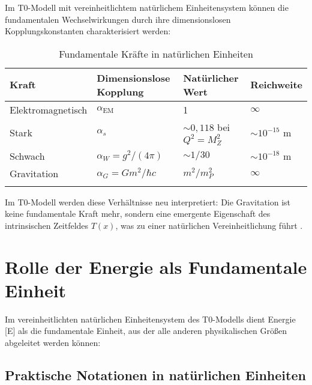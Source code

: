 \documentclass[12pt,a4paper]{article}
\newcommand{\Tfield}{T(x)}
\newcommand{\alphaEM}{\alpha_{\text{EM}}}
\begin{document}
	Im T0-Modell mit vereinheitlichtem natürlichem Einheitensystem können die fundamentalen Wechselwirkungen durch ihre dimensionslosen Kopplungskonstanten charakterisiert werden:
	
	\begin{table}[ht]
		\centering
		\begin{adjustbox}{scale=0.95}
			\begin{tabular}{llll}
				\hline
				\textbf{Kraft} & \textbf{Dimensionslose Kopplung} & \textbf{Natürlicher Wert} & \textbf{Reichweite} \\
				\hline
				Elektromagnetisch & $\alphaEM$ & 1 & $\infty$ \\
				Stark & $\alpha_s$ & $\sim 0,118$ bei $Q^2=M_Z^2$ & $\sim 10^{-15}$ m \\
				Schwach & $\alpha_W = g^2/(4\pi)$ & $\sim 1/30$ & $\sim 10^{-18}$ m \\
				Gravitation & $\alpha_G = Gm^2/\hbar c$ & $m^2/m_P^2$ & $\infty$ \\
				\hline
				\multicolumn{3}{c}{} \\
				\hline
			\end{tabular}
		\end{adjustbox}
		\caption{Fundamentale Kräfte in natürlichen Einheiten}
		\label{tab:forces}
	\end{table}
	
	Im T0-Modell werden diese Verhältnisse neu interpretiert: Die Gravitation ist keine fundamentale Kraft mehr, sondern eine emergente Eigenschaft des intrinsischen Zeitfeldes $\Tfield$, was zu einer natürlichen Vereinheitlichung führt \cite{pascher_grundkraefte_2025}.
	
	\section{Rolle der Energie als Fundamentale Einheit}
	
	Im vereinheitlichten natürlichen Einheitensystem des T0-Modells dient Energie [E] als die fundamentale Einheit, aus der alle anderen physikalischen Größen abgeleitet werden können:
	
	\subsection{Praktische Notationen in natürlichen Einheiten}
	
\end{document}
